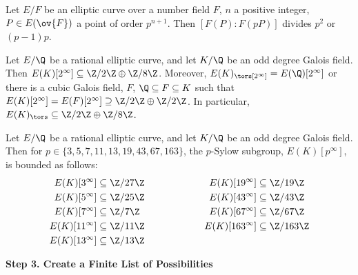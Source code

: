 \begin{frame}[plain,c]
\footnotesize 

\begin{thm} 
Let $E/F$ be an elliptic curve over a number field $F$, $n$ a positive integer, $P \in E(\ov{F})$ a point of order $p^{n+1}$. Then $[F(P) \colon F(pP)]$ divides $p^2$ or $(p - 1)p$.
\end{thm}

\begin{lem}[M.]
Let $E/\Q$ be a rational elliptic curve, and let $K/\Q$ be an odd degree Galois field. Then $E(K)[2^\infty] \subseteq \Z/2\Z \oplus \Z/8\Z$. Moreover, $E(K)_\tors[2^\infty]= E(\Q)[2^\infty]$ or there is a cubic Galois field, $F$, $\Q \subseteq F \subseteq K$ such that $E(K)[2^\infty]= E(F)[2^\infty] \supseteq \Z/2\Z \oplus \Z/2\Z$. In particular, $E(K)_\tors \subseteq \Z/2\Z \oplus \Z/8\Z$.  
\end{lem} 

\begin{lem}[M.]
Let $E/\Q$ be a rational elliptic curve, and let $K/\Q$ be an odd degree Galois field. Then for $p \in \{ 3, 5, 7, 11, 13, 19, 43, 67, 163 \}$, the $p$-Sylow subgroup, $E(K)[p^\infty]$, is bounded as follows:
	\[
	\begin{aligned}
	E(K)[3^\infty] &\subseteq \Z/27\Z &\hspace{2cm} E(K)[19^\infty] &\subseteq \Z/19\Z \\
	E(K)[5^\infty] &\subseteq \Z/25\Z & E(K)[43^\infty] &\subseteq \Z/43\Z \\
	E(K)[7^\infty] &\subseteq \Z/7\Z & E(K)[67^\infty] &\subseteq \Z/67\Z \\
	E(K)[11^\infty] &\subseteq \Z/11\Z & E(K)[163^\infty] &\subseteq \Z/163\Z \\
	E(K)[13^\infty] &\subseteq \Z/13\Z & &
	\end{aligned}
	\]
\end{lem}

\end{frame}





\begin{frame}[plain]
\vfill
\begin{center} {\bfseries \Large \textcolor{UniOrange}{Step 3. Create a Finite List of Possibilities}} \end{center}
\vfill 
\end{frame}





